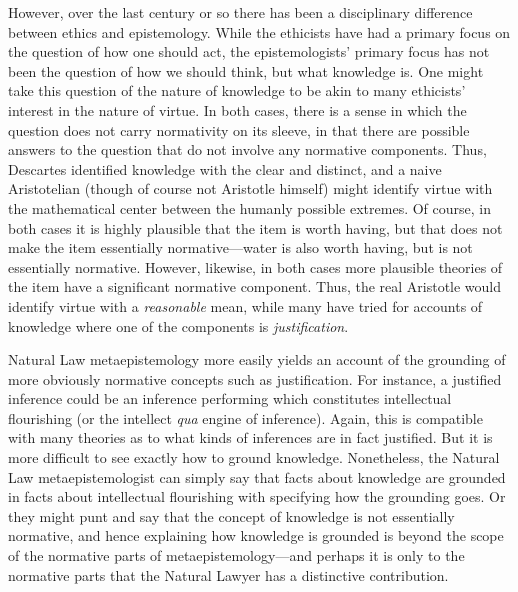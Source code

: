 However, over the last century or so there has been a disciplinary difference between ethics and epistemology. While the ethicists
have had a primary focus on the question of how one should act, the epistemologists' primary focus has not been the question of 
how we should think, but what knowledge is. One might take this question of the nature of knowledge to be akin to many ethicists' 
interest in the nature of virtue. In both cases, there is a sense in which the question does not carry normativity on its sleeve,
in that there are possible answers to the question that do not involve any normative components. Thus, Descartes identified knowledge
with the clear and distinct, and a naive Aristotelian (though of course not Aristotle himself) might identify virtue with the 
mathematical center between the humanly possible extremes. Of course, in both cases it is highly plausible that the item is worth
having, but that does not make the item essentially normative---water is also worth having, but is not essentially normative.
However, likewise, in both cases more plausible theories of the item have a significant normative component. Thus, the real 
Aristotle would identify virtue with a \textit{reasonable} mean, while many have tried for accounts of knowledge where one of the
components is \textit{justification}. 

Natural Law metaepistemology more easily yields an account of the grounding of more obviously normative concepts such as 
justification. For instance, a justified inference could be an inference performing which constitutes intellectual flourishing 
(or the intellect \textit{qua} engine of inference). Again, this is compatible with many theories as to what kinds of inferences
are in fact justified. But it is more difficult to see exactly how to ground knowledge. Nonetheless, the Natural Law metaepistemologist
can simply say that facts about knowledge are grounded in facts about intellectual flourishing with specifying how the grounding
goes.  Or they might punt and say that the concept of knowledge is not essentially normative, and hence explaining how knowledge is
grounded is beyond the scope of the normative parts of metaepistemology---and perhaps it is only to the normative parts that the
Natural Lawyer has a distinctive contribution.

